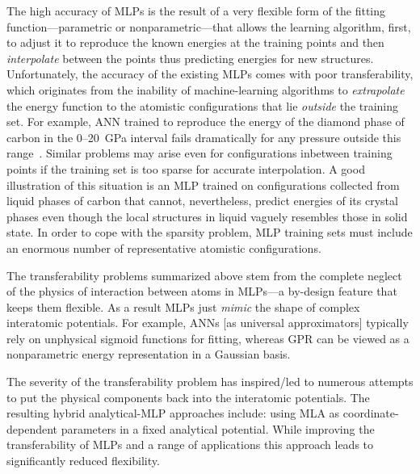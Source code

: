 \documentclass[aps,prl,reprint,amsmath,amssymb,nature]{revtex4-1}
\begin{document}

The high accuracy of MLPs is the result of a very flexible form of the fitting function---parametric or nonparametric---that allows the learning algorithm, first, to adjust it to reproduce the 
known energies at the training points and then \textit{interpolate} between the points thus predicting energies for new structures. 
Unfortunately, the accuracy of the existing MLPs comes with poor transferability, which originates from the inability of machine-learning algorithms to \textit{extrapolate} the energy function to the atomistic configurations that 
lie \emph{outside} the training set.
For example, ANN trained to reproduce the energy of the diamond phase of carbon in the 0--20~GPa interval fails dramatically for any pressure outside this range~\cite{Khaliullin2010,Khaliullin2011}. 
Similar problems may arise even for configurations inbetween training points if the training set is too sparse for accurate interpolation. 
A good illustration of this situation is an MLP trained on configurations collected from liquid phases of carbon that cannot, nevertheless, predict energies of its crystal phases even though the local structures in liquid vaguely resembles those in solid state. 
In order to cope with the sparsity problem, MLP training sets must include an enormous number of representative atomistic configurations. 

The transferability problems summarized above stem from the complete neglect of the physics of interaction between atoms in MLPs---a by-design feature that keeps them flexible. As a result MLPs just \emph{mimic} the shape of complex interatomic potentials. For example, ANNs [as universal approximators] typically rely on unphysical sigmoid functions for fitting, whereas GPR can be viewed as a nonparametric energy representation in a Gaussian basis. 

The severity of the transferability problem has inspired/led to numerous attempts to put the physical components back into the interatomic potentials. The resulting hybrid analytical-MLP approaches  include: using MLA as coordinate-dependent parameters in a fixed analytical potential. 
While improving the transferability of MLPs and a range of applications this approach leads to significantly reduced flexibility.
\end{document}
